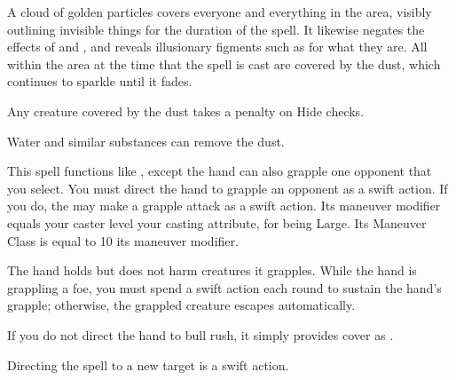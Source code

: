 \spellrng{\rngmed}
\spelldur{\durshort}
\begin{spelleffect}
  A cloud of golden particles covers everyone and everything in the area, visibly outlining invisible things for the duration of the spell. It likewise negates the effects of  and , and reveals illusionary figments such as  for what they are. All within the area at the time that the spell is cast are covered by the dust, which continues to sparkle until it fades.
  \par Any creature covered by the dust takes a  penalty on Hide checks.
\end{spelleffect}
\begin{spelleffect}
  Water and similar substances can remove the dust.
\end{spelleffect}

\begin{spelleffect}
  This spell functions like , except the hand can also grapple one opponent that you select. You must direct the hand to grapple an opponent as a swift action. If you do, the  may make a grapple attack as a swift action. Its maneuver modifier equals your caster level \add your casting attribute,  for being Large. Its Maneuver Class is equal to 10 \add its maneuver modifier.
  \par The hand holds but does not harm creatures it grapples. While the hand is grappling a foe, you must spend a swift action each round to sustain the hand's grapple; otherwise, the grappled creature escapes automatically.
  \par If you do not direct the hand to bull rush, it simply provides cover as .
\end{spelleffect}
\begin{spellnotes}
  Directing the spell to a new target is a swift action.
\end{spellnotes}

